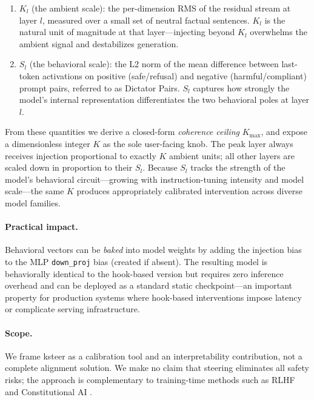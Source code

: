 \documentclass[10pt]{article}
\begin{document}
\begin{enumerate}[leftmargin=*]
  \item \textbf{$K_l$} (the ambient scale): the per-dimension RMS of the
    residual stream at layer $l$, measured over a small set of neutral factual
    sentences.  $K_l$ is the natural unit of magnitude at that layer---injecting
    beyond $K_l$ overwhelms the ambient signal and destabilizes generation.
  \item \textbf{$S_l$} (the behavioral scale): the L2 norm of the mean
    difference between last-token activations on positive (safe/refusal) and
    negative (harmful/compliant) prompt pairs, referred to as Dictator Pairs.
    $S_l$ captures how strongly the model's internal representation
    differentiates the two behavioral poles at layer $l$.
\end{enumerate}

From these quantities we derive a closed-form \emph{coherence ceiling}
$K_\text{max}$, and expose a dimensionless integer $K$ as the sole user-facing
knob.  The peak layer always receives injection proportional to exactly $K$
ambient units; all other layers are scaled down in proportion to their $S_l$.
Because $S_l$ tracks the strength of the model's behavioral circuit---growing
with instruction-tuning intensity and model scale---the same $K$ produces
appropriately calibrated intervention across diverse model families.

\paragraph{Practical impact.}
Behavioral vectors can be \emph{baked} into model weights by adding the
injection bias to the MLP \texttt{down\_proj} bias (created if absent).  The
resulting model is behaviorally identical to the hook-based version but
requires zero inference overhead and can be deployed as a standard static
checkpoint---an important property for production systems where hook-based
interventions impose latency or complicate serving infrastructure.

\paragraph{Scope.}
We frame ksteer as a calibration tool and an interpretability contribution,
not a complete alignment solution.  We make no claim that steering eliminates
all safety risks; the approach is complementary to training-time methods such
as RLHF \citep{ouyang2022instructgpt} and Constitutional AI
\citep{bai2022constitutional}.
\end{document}
